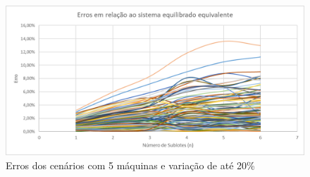 \begin{figure}[!ht]
    \centering
    \includegraphics[width=12cm]{Resultados/Figuras/e05_20}
    \caption{Erros dos cenários com 5 máquinas e variação de até 20\%}
    \label{fig:e05_20}
\end{figure}